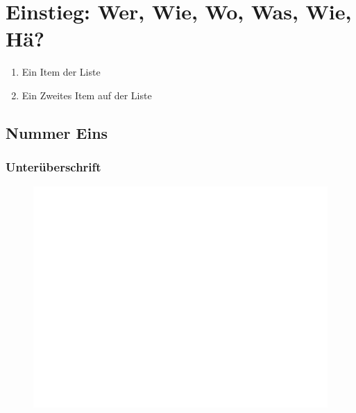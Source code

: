 \documentclass[12pt, a4paper, twoside, openany]{book}
\begin{document}
\section*{Einstieg: Wer, Wie, Wo, Was, Wie, Hä?}
\begin{multicols}{2}
        \Blindtext[1][1]
        \begin{enumerate}[label=\textbullet]
                \item Ein Item der Liste
                \item Ein Zweites Item auf der Liste

        \end{enumerate}

\subsection*{Nummer Eins}
\Blindtext[1][1]
\subsubsection*{Unterüberschrift}
\end{multicols}
\begin{figure}[H]
        \centering
        \includegraphics[width=.6\textwidth]{bilder/foo.png}
        \label{fig:piel}
\end{figure}
\end{document}
